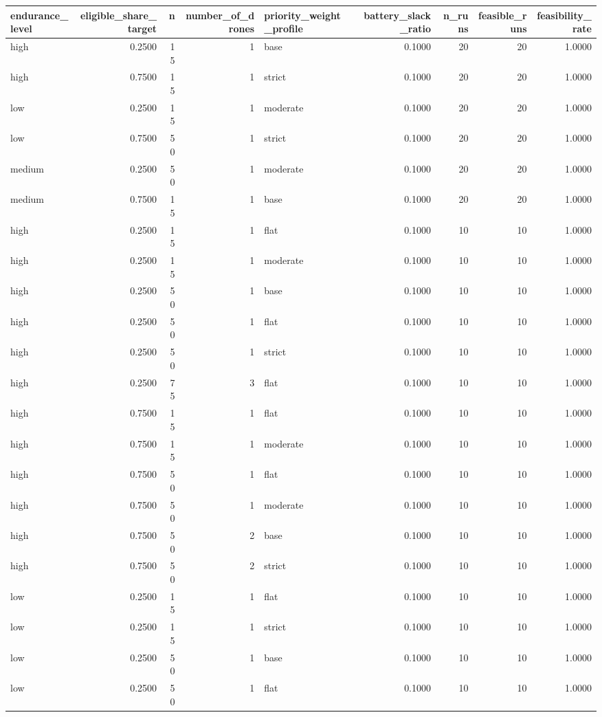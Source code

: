 \begin{tabular}{lrrrlrrrr}
\toprule
endurance_level & eligible_share_target & n & number_of_drones & priority_weight_profile & battery_slack_ratio & n_runs & feasible_runs & feasibility_rate \\
\midrule
high & 0.2500 & 15 & 1 & base & 0.1000 & 20 & 20 & 1.0000 \\
high & 0.7500 & 15 & 1 & strict & 0.1000 & 20 & 20 & 1.0000 \\
low & 0.2500 & 15 & 1 & moderate & 0.1000 & 20 & 20 & 1.0000 \\
low & 0.7500 & 50 & 1 & strict & 0.1000 & 20 & 20 & 1.0000 \\
medium & 0.2500 & 50 & 1 & moderate & 0.1000 & 20 & 20 & 1.0000 \\
medium & 0.7500 & 15 & 1 & base & 0.1000 & 20 & 20 & 1.0000 \\
high & 0.2500 & 15 & 1 & flat & 0.1000 & 10 & 10 & 1.0000 \\
high & 0.2500 & 15 & 1 & moderate & 0.1000 & 10 & 10 & 1.0000 \\
high & 0.2500 & 50 & 1 & base & 0.1000 & 10 & 10 & 1.0000 \\
high & 0.2500 & 50 & 1 & flat & 0.1000 & 10 & 10 & 1.0000 \\
high & 0.2500 & 50 & 1 & strict & 0.1000 & 10 & 10 & 1.0000 \\
high & 0.2500 & 75 & 3 & flat & 0.1000 & 10 & 10 & 1.0000 \\
high & 0.7500 & 15 & 1 & flat & 0.1000 & 10 & 10 & 1.0000 \\
high & 0.7500 & 15 & 1 & moderate & 0.1000 & 10 & 10 & 1.0000 \\
high & 0.7500 & 50 & 1 & flat & 0.1000 & 10 & 10 & 1.0000 \\
high & 0.7500 & 50 & 1 & moderate & 0.1000 & 10 & 10 & 1.0000 \\
high & 0.7500 & 50 & 2 & base & 0.1000 & 10 & 10 & 1.0000 \\
high & 0.7500 & 50 & 2 & strict & 0.1000 & 10 & 10 & 1.0000 \\
low & 0.2500 & 15 & 1 & flat & 0.1000 & 10 & 10 & 1.0000 \\
low & 0.2500 & 15 & 1 & strict & 0.1000 & 10 & 10 & 1.0000 \\
low & 0.2500 & 50 & 1 & base & 0.1000 & 10 & 10 & 1.0000 \\
low & 0.2500 & 50 & 1 & flat & 0.1000 & 10 & 10 & 1.0000 \\

\end{tabular}
